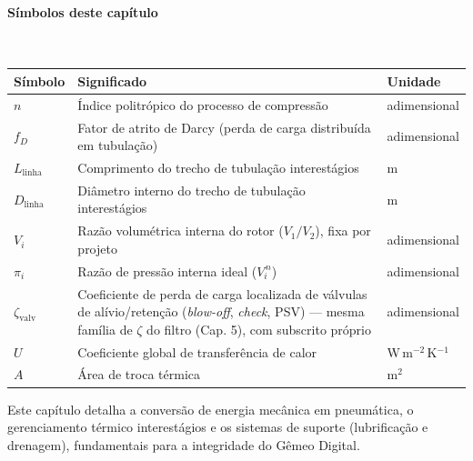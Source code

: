 \documentclass[12pt,a4paper]{article}
\numberwithin{equation}{section}
\numberwithin{table}{section}
\numberwithin{figure}{section}
\begin{document}
\paragraph{Símbolos deste capítulo}\mbox{}\\[-0.5em]
{\small
\begin{longtable}{>{\raggedright\arraybackslash}p{2.6cm} >{\raggedright\arraybackslash}p{9.2cm} >{\raggedright\arraybackslash}p{2.6cm}}
	\toprule
	\textbf{Símbolo} & \textbf{Significado} & \textbf{Unidade} \\ \midrule
	\endhead
	$n$ & Índice politrópico do processo de compressão & adimensional \\
	$f_D$\dag & Fator de atrito de Darcy (perda de carga distribuída em tubulação) & adimensional \\
	$L_{\text{linha}}$ & Comprimento do trecho de tubulação interestágios & m \\
	$D_{\text{linha}}$ & Diâmetro interno do trecho de tubulação interestágios & m \\
	$V_i$ & Razão volumétrica interna do rotor ($V_1/V_2$), fixa por projeto & adimensional \\
	$\pi_i$ & Razão de pressão interna ideal ($V_i^{\,n}$) & adimensional \\
	$\zeta_{\text{valv}}$\dag & Coeficiente de perda de carga localizada de válvulas de alívio/retenção (\textit{blow-off}, \textit{check}, PSV) — mesma família de $\zeta$ do filtro (Cap. 5), com subscrito próprio & adimensional \\
	$U$ & Coeficiente global de transferência de calor & W\,m$^{-2}$\,K$^{-1}$ \\
	$A$ & Área de troca térmica & m$^2$ \\
	\bottomrule
\end{longtable}
}




	
	Este capítulo detalha a conversão de energia mecânica em pneumática, o gerenciamento térmico interestágios e os sistemas de suporte (lubrificação e drenagem), fundamentais para a integridade do Gêmeo Digital.
	
\end{document}
